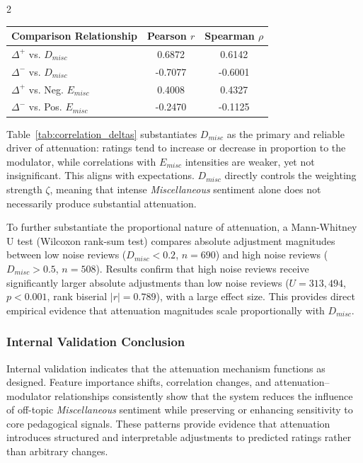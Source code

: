 \documentclass{article}
\begin{document}
\begin{multicols*}{2}
\begin{center}
    \label{tab:correlation_deltas}
    \begin{tabular}{lcc}
    \toprule
    Comparison Relationship & Pearson $r$ & Spearman $\rho$ \\
    \midrule
    $\Delta^+$ vs. $D_{misc}$ & 0.6872 & 0.6142 \\
    $\Delta^-$ vs. $D_{misc}$ & -0.7077 & -0.6001 \\
    \midrule
    $\Delta^+$ vs. Neg. $E_{misc}$  & 0.4008 & 0.4327 \\
    $\Delta^-$ vs. Pos. $E_{misc}$  & -0.2470 & -0.1125 \\
    \bottomrule   
    \end{tabular}
\end{center}

Table~\ref{tab:correlation_deltas} substantiates $D_{misc}$ as the primary and reliable driver of attenuation: ratings tend to increase or decrease in proportion to the modulator, while correlations with $E_{misc}$ intensities are weaker, yet not insignificant. This aligns with expectations. $D_{misc}$ directly controls the weighting strength $\zeta$, meaning that intense \textit{Miscellaneous} sentiment alone does not necessarily produce substantial attenuation.

To further substantiate the proportional nature of attenuation, a Mann-Whitney U test (Wilcoxon rank-sum test) compares absolute adjustment magnitudes between low noise reviews ($D_{misc} < 0.2$, $n=690$) and high noise reviews ($D_{misc} > 0.5$, $n=508$). Results confirm that high noise reviews receive significantly larger absolute adjustments than low noise reviews ($U = 313{,}494$, $p < 0.001$, rank biserial $|r| = 0.789$), with a large effect size. This provides direct empirical evidence that attenuation magnitudes scale proportionally with $D_{misc}$.

\subsubsection{Internal Validation Conclusion}
Internal validation indicates that the attenuation mechanism functions as designed. Feature importance shifts, correlation changes, and attenuation–modulator relationships consistently show that the system reduces the influence of off-topic \textit{Miscellaneous} sentiment while preserving or enhancing sensitivity to core pedagogical signals. These patterns provide evidence that attenuation introduces structured and interpretable adjustments to predicted ratings rather than arbitrary changes.

\end{multicols*}
\end{document}
